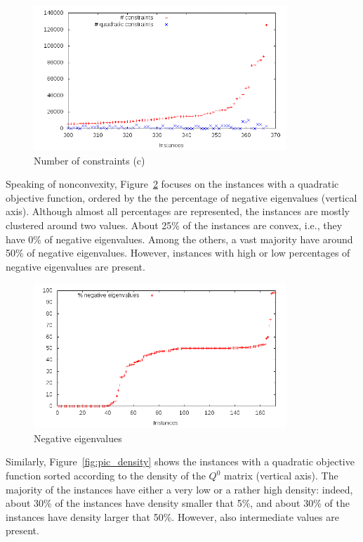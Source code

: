 \begin{figure}\centering
  \includegraphics[width=0.85\textwidth]{pic_constr_big.png}
  \caption{Number of constraints (c) \label{fig:pic_constr_big}}
\end{figure}

Speaking of nonconvexity, Figure~\ref{fig:pic_neg_eig} focuses on
the instances with a quadratic objective function, ordered by the
the percentage of negative eigenvalues (vertical axis). Although
almost all percentages are represented, the instances are mostly
clustered around two values. About 25\% of the instances are convex,
i.e., they have 0\% of negative eigenvalues. Among the others, a vast
majority have around 50\% of negative eigenvalues. However, instances
with high or low percentages of negative eigenvalues are present.

\begin{figure}\centering
  \includegraphics[width=0.85\textwidth]{pic_neg_eig.png}
  \caption{Negative eigenvalues \label{fig:pic_neg_eig}}
\end{figure}

Similarly, Figure~\ref{fig:pic_density} shows the instances with a
quadratic objective function sorted according to the density of the
$Q^0$ matrix (vertical axis). The majority of the instances have either
a very low or a rather high density: indeed, about 30\% of the instances
have density smaller that 5\%, and about 30\% of the instances have
density larger that 50\%. However, also intermediate values are present. 

